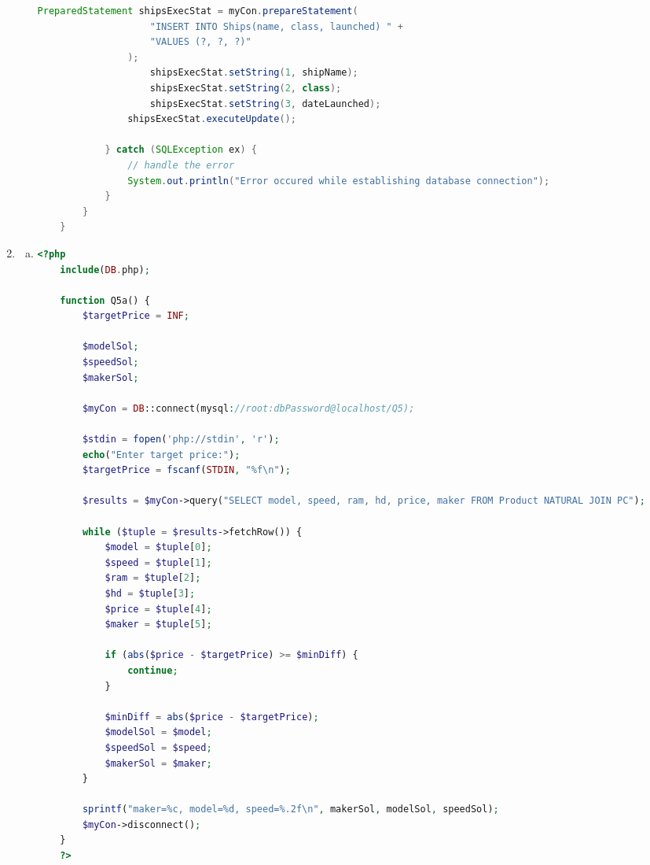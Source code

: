 \documentclass[12pt]{article}
\begin{document}
\begin{enumerate}[1.]
\begin{enumerate}[a)]
\begin{lstlisting}[language=JAVA]
                PreparedStatement shipsExecStat = myCon.prepareStatement(
                    "INSERT INTO Ships(name, class, launched) " +
                    "VALUES (?, ?, ?)"
                );
                    shipsExecStat.setString(1, shipName);
                    shipsExecStat.setString(2, class);
                    shipsExecStat.setString(3, dateLaunched);
                shipsExecStat.executeUpdate();

            } catch (SQLException ex) {
                // handle the error
                System.out.println("Error occured while establishing database connection");
            }
        }
    }
    \end{lstlisting}

    \end{enumerate}

        \item

    \begin{enumerate}[a)]
        \item

    \begin{lstlisting}[language=PHP]
    <?php
    include(DB.php);

    function Q5a() {
        $targetPrice = INF;

        $modelSol;
        $speedSol;
        $makerSol;

        $myCon = DB::connect(mysql://root:dbPassword@localhost/Q5);

        $stdin = fopen('php://stdin', 'r');
        echo("Enter target price:");
        $targetPrice = fscanf(STDIN, "%f\n");

        $results = $myCon->query("SELECT model, speed, ram, hd, price, maker FROM Product NATURAL JOIN PC");

        while ($tuple = $results->fetchRow()) {
            $model = $tuple[0];
            $speed = $tuple[1];
            $ram = $tuple[2];
            $hd = $tuple[3];
            $price = $tuple[4];
            $maker = $tuple[5];

            if (abs($price - $targetPrice) >= $minDiff) {
                continue;
            }

            $minDiff = abs($price - $targetPrice);
            $modelSol = $model;
            $speedSol = $speed;
            $makerSol = $maker;
        }

        sprintf("maker=%c, model=%d, speed=%.2f\n", makerSol, modelSol, speedSol);
        $myCon->disconnect();
    }
    ?>
    \end{lstlisting}


\end{enumerate}
\end{enumerate}
\end{document}
